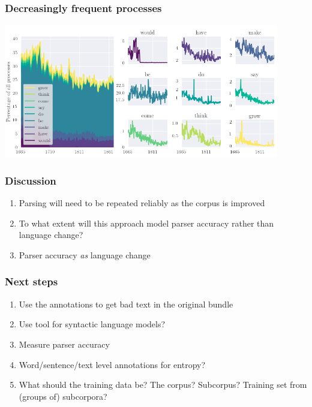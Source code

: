 \documentclass{beamer}       %
\begin{document}
\begin{frame}
    \frametitle{Decreasingly frequent processes}
    \centering
    \includegraphics[width=0.90\textwidth]{../images/dec-proc}
\end{frame}

\begin{frame}
\frametitle{Discussion}
\begin{enumerate}
    \item Parsing will need to be repeated reliably as the corpus is improved
    \item To what extent will this approach model parser accuracy rather than language change?
    \item Parser accuracy \emph{as} language change
\end{enumerate}
\end{frame}

\begin{frame}
\frametitle{Next steps}

\begin{enumerate}
    \item Use the annotations to get bad text in the original bundle
    \item Use tool for syntactic language models?
    \item Measure parser accuracy
    \item Word\slash sentence\slash text level annotations for entropy?
    \item What should the training data be? The corpus? Subcorpus? Training set from (groups of) subcorpora?
\end{enumerate}
\end{frame}
\end{document}
